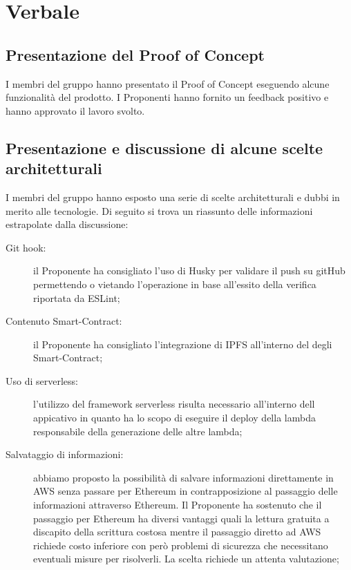 \section{Verbale}
\subsection{Presentazione del Proof of Concept}
I membri del gruppo hanno presentato il Proof of Concept eseguendo alcune funzionalità del prodotto. I Proponenti hanno fornito un feedback positivo e hanno approvato il lavoro svolto.


\subsection{Presentazione e discussione di alcune scelte architetturali}
I membri del gruppo hanno esposto una serie di scelte architetturali e dubbi in merito alle tecnologie.
Di seguito si trova un riassunto delle informazioni estrapolate dalla discussione:
\begin{description}
	\item [Git hook:] il Proponente ha consigliato l'uso di Husky per validare il push su gitHub permettendo o vietando l'operazione in base all'essito della verifica riportata da ESLint;
		\item [Contenuto Smart-Contract:] il Proponente ha consigliato l'integrazione di IPFS all'interno del degli Smart-Contract;
		\item [Uso di serverless:] l'utilizzo del framework serverless risulta necessario all'interno dell appicativo in quanto ha lo scopo di eseguire il deploy della lambda responsabile della generazione delle altre lambda;
		\item [Salvataggio di informazioni:] abbiamo proposto la possibilità di salvare informazioni direttamente in AWS senza passare per Ethereum in contrapposizione al passaggio delle informazioni attraverso Ethereum. Il Proponente ha sostenuto che il passaggio per Ethereum ha diversi vantaggi quali la lettura gratuita a discapito della scrittura costosa mentre il passaggio diretto ad AWS richiede costo inferiore con però problemi di sicurezza che necessitano eventuali misure per risolverli. La scelta richiede un attenta valutazione;
\end{description}
